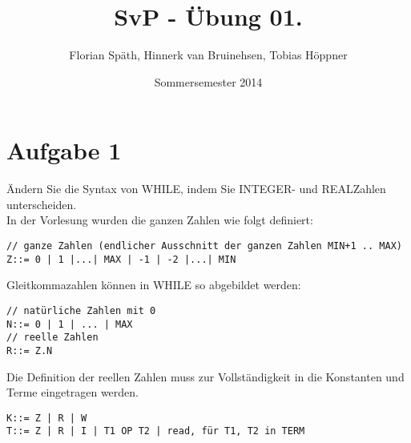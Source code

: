 \documentclass[ngerman,a4paper]{report}
\author{Florian Späth, Hinnerk van Bruinehsen, Tobias Höppner}
\title{SvP - Übung 01. }
\date{Sommersemester 2014}
\renewcommand{\maketitle}{}
\begin{document}
 
\maketitle 
\section*{Aufgabe 1}
Ändern Sie die Syntax von WHILE, indem Sie INTEGER- und REALZahlen unterscheiden.\\
In der Vorlesung wurden die ganzen Zahlen wie folgt definiert:
\begin{lstlisting}
// ganze Zahlen (endlicher Ausschnitt der ganzen Zahlen MIN+1 .. MAX)
Z::= 0 | 1 |...| MAX | -1 | -2 |...| MIN 
\end{lstlisting}
Gleitkommazahlen können in WHILE so abgebildet werden:
\begin{lstlisting}
// natürliche Zahlen mit 0
N::= 0 | 1 | ... | MAX
// reelle Zahlen
R::= Z.N
\end{lstlisting}
Die Definition der reellen Zahlen muss zur Vollständigkeit in die Konstanten und Terme eingetragen werden.
\begin{lstlisting}
K::= Z | R | W
T::= Z | R | I | T1 OP T2 | read, für T1, T2 in TERM
\end{lstlisting}
\end{document}
